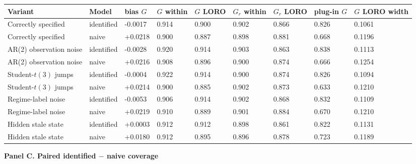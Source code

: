 \begin{table}[!htbp]
\begin{adjustbox}{max width=\linewidth}
\begin{tabular}{@{}lllllllll@{}}
\toprule
Variant & Model & bias $G$ & $G$ within & $G$ LORO & $G_r$ within & $G_r$ LORO & plug-in $G$ & $G$ LORO width \\
\midrule
Correctly specified & identified & -0.0017 & 0.914 & 0.900 & 0.902 & 0.866 & 0.826 & 0.1061 \\
Correctly specified & naive & +0.0218 & 0.900 & 0.887 & 0.898 & 0.881 & 0.668 & 0.1196 \\
AR(2) observation noise & identified & -0.0028 & 0.920 & 0.914 & 0.903 & 0.863 & 0.838 & 0.1113 \\
AR(2) observation noise & naive & +0.0216 & 0.908 & 0.896 & 0.900 & 0.874 & 0.666 & 0.1254 \\
Student-$t(3)$ jumps & identified & -0.0004 & 0.922 & 0.914 & 0.900 & 0.874 & 0.826 & 0.1094 \\
Student-$t(3)$ jumps & naive & +0.0214 & 0.900 & 0.885 & 0.902 & 0.873 & 0.633 & 0.1210 \\
Regime-label noise & identified & -0.0053 & 0.906 & 0.914 & 0.902 & 0.868 & 0.832 & 0.1109 \\
Regime-label noise & naive & +0.0219 & 0.910 & 0.889 & 0.901 & 0.884 & 0.670 & 0.1210 \\
Hidden stale state & identified & +0.0003 & 0.912 & 0.912 & 0.898 & 0.861 & 0.822 & 0.1131 \\
Hidden stale state & naive & +0.0180 & 0.912 & 0.895 & 0.896 & 0.878 & 0.723 & 0.1189 \\
\bottomrule
\end{tabular}
\end{adjustbox}
\vspace{0.5em}
\par\textbf{Panel C. Paired identified $-$ naive coverage}


\end{table}

